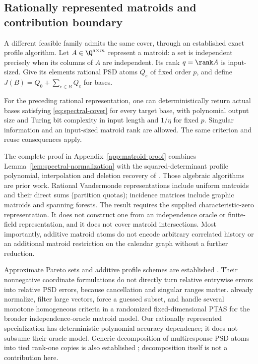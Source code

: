\subsection{Rationally represented matroids and contribution boundary}
\label{subsec:matroid-cover}
A different feasible family admits the same cover, through an established
exact profile algorithm. Let $A\in\Q^{a\times m}$ represent a matroid:
a set is independent precisely when its columns of $A$ are independent.
Its rank $q=\rank A$ is input-sized. Give its elements rational PSD atoms
$Q_e$ of fixed order $p$, and define $J(B)=Q_0+\sum_{e\in B}Q_e$ for bases.
\begin{theorem}
\label{thm:matroid-spectral-set}
For the preceding rational representation, one can deterministically return
actual bases satisfying \eqref{eq:spectral-cover} for every target base,
with polynomial output size and Turing bit complexity in input length and
$1/\eta$ for fixed $p$. Singular information and an input-sized matroid
rank are allowed. The same criterion and reuse consequences apply.
\end{theorem}
The complete proof in Appendix~\ref{app:matroid-proof} combines
Lemma~\ref{lem:spectral-normalization} with the squared-determinant profile
polynomial, interpolation and deletion recovery of \citet{Berstein2008}.
Those algebraic algorithms are prior work. Rational Vandermonde
representations include uniform matroids and their direct sums (partition
quotas); incidence matrices include graphic matroids and spanning forests.
The result requires the supplied characteristic-zero representation. It does
not construct one from an independence oracle or finite-field representation,
and it does not cover matroid intersections. Most importantly, additive
matroid atoms do not encode arbitrary correlated history or an additional
matroid restriction on the calendar graph without a further reduction.

Approximate Pareto sets and additive profile schemes are established
\citep{Papadimitriou2000,Tsaggouris2009,Mittal2013}. Their nonnegative
coordinate formulations do not directly turn relative entrywise errors into
relative PSD errors, because cancellation and singular ranges matter.
\citet{Brown2024} already normalize, filter large vectors, force a guessed
subset, and handle several monotone homogeneous criteria in a randomized
fixed-dimensional PTAS for the broader independence-oracle matroid model.
Our rationally represented specialization has deterministic polynomial
accuracy dependence; it does not subsume their oracle model.
Generic decomposition of multiresponse PSD atoms into tied rank-one copies
is also established \citep[Theorem 1]{Filova2026}; decomposition itself is
not a contribution here.

